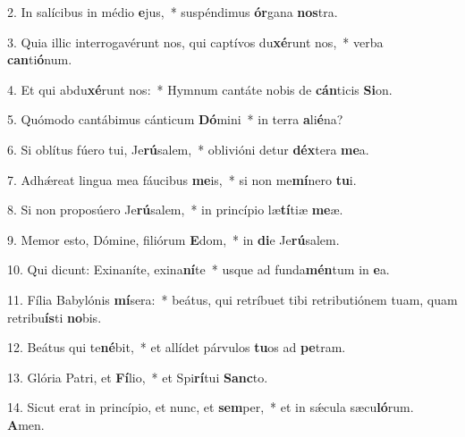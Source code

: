 2. In salícibus in médio \textbf{e}jus,~*  suspéndimus \textbf{ór}gana \textbf{nos}tra.\

3. Quia illic interrogavérunt nos, qui captívos du\textbf{xé}runt nos,~*  verba \textbf{can}ti\textbf{ó}num.\

4. Et qui abdu\textbf{xé}runt nos:~*  Hymnum cantáte nobis de \textbf{cán}ticis \textbf{Si}on.\

5. Quómodo cantábimus cánticum \textbf{Dó}mini~*  in terra \textbf{a}li\textbf{é}na?\

6. Si oblítus fúero tui, Je\textbf{rú}salem,~*  oblivióni detur \textbf{déx}tera \textbf{me}a.\

7. Adhǽreat lingua mea fáucibus \textbf{me}is,~*  si non me\textbf{mí}nero \textbf{tu}i.\

8. Si non proposúero Je\textbf{rú}salem,~*  in princípio læ\textbf{tí}tiæ \textbf{me}æ.\

9. Memor esto, Dómine, filiórum \textbf{E}dom,~*  in \textbf{di}e Je\textbf{rú}salem.\

10. Qui dicunt: Exinaníte, exina\textbf{ní}te~*  usque ad funda\textbf{mén}tum in \textbf{e}a.\

11. Fília Babylónis \textbf{mí}sera:~*  beátus, qui retríbuet tibi retributiónem tuam, quam retribu\textbf{ís}ti \textbf{no}bis.\

12. Beátus qui te\textbf{né}bit,~*  et allídet párvulos \textbf{tu}os ad \textbf{pe}tram.\

13. Glória Patri, et \textbf{Fí}lio,~*  et Spi\textbf{rí}tui \textbf{Sanc}to.\

14. Sicut erat in princípio, et nunc, et \textbf{sem}per,~*  et in sǽcula sæcu\textbf{ló}rum. \textbf{A}men.\

